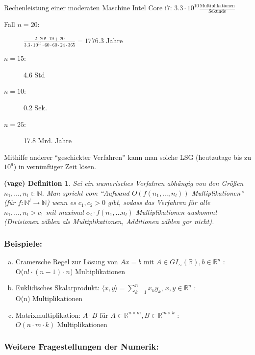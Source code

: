 \documentclass[a4paper]{scrartcl}
\newcounter{mydefctr}
\newtheorem{vmydef}[mydefctr]{(vage) Definition}
\begin{document}
Rechenleistung einer moderaten Maschine Intel Core i7: $3.3 \cdot 10^{10} 
\frac{\text{Multiplikationen}}{\text{Sekunde}}$ 

\begin{description}
\item[\rm Fall $n = 20$:] $\frac{2 \cdot 20! \cdot 19 + 20}{3.3 \cdot 10^{10} 
\cdot 60 \cdot 60 \cdot 24 \cdot 365} = 1776.3$ Jahre
\item[$n = 15$:] 4.6 Std
\item[$n = 10$:] 0.2 Sek.
\item[$n = 25$:] 17.8 Mrd. Jahre
\end{description}

Mithilfe anderer "`geschickter Verfahren"' kann man solche LSG 
(heutzutage bis zu $10^9$) in vernünftiger Zeit lösen.

\begin{vmydef}
Sei ein numerisches Verfahren abhängig von den 
Größen $n_1, \dots, n_l \in \mathbb{N}$. Man spricht vom 
"`Aufwand $O(f(n_1, \dots, n_l))$ Multiplikationen"'
(für $f: \mathbb{N}^l \rightarrow \mathbb{N}$) wenn es 
$c_1, c_2 > 0$ gibt, sodass das Verfahren für alle 
$n_1, \dots, n_l > c_1$ mit maximal $c_2 \cdot f(n_1, \dots n_l)$
Multiplikationen auskommt (Divisionen zählen als Multiplikationen, 
Additionen zählen gar nicht).
\end{vmydef}

\subsubsection*{Beispiele:}

\begin{enumerate}[(a)]
\item Cramersche Regel zur Lösung von
      $Ax = b$ mit $A \in GI_{\sim}(\mathbb{R}), 
      b \in \mathbb{R}^n$ : \\
      O($n! \cdot (n-1)\cdot n$) Multiplikationen
\item Euklidisches Skalarprodukt:
      $\langle x,y\rangle = \sum_{k=1}^n x_k y_k$, $x,y \in \mathbb{R}^n$ :\\
      O(n) Multiplikationen
\item Matrixmultiplikation: $A \cdot B \text{ für } A\in 
      \mathbb{R}^{n \times m}, B \in \mathbb{R}^{m \times k}$ : \\
      $O(n \cdot m \cdot k ) $ Multiplikationen
\end{enumerate}  

\subsubsection*{Weitere Fragestellungen der Numerik:}
\end{document}
